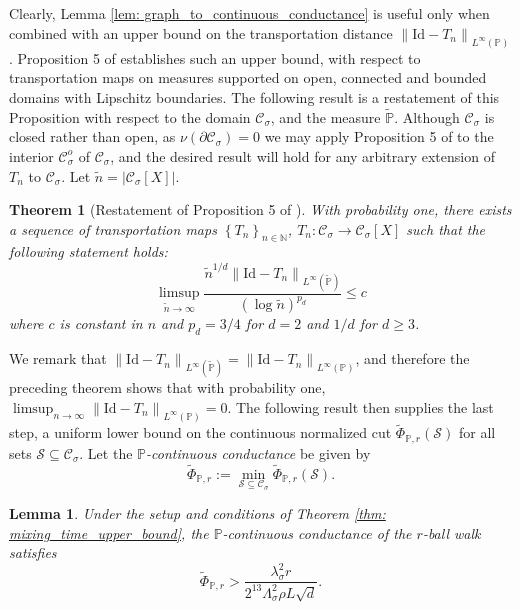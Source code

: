 \documentclass[11pt,twoside]{article}
\newtheorem{theorem}{Theorem}
\newtheorem{lemma}{Lemma}
\newcommand{\seq}[1]{\left\{#1\right\}_{n \in \mathbb{N}}}
\newcommand{\abs}[1]{\left \lvert #1 \right \rvert}
\newcommand{\norm}[1]{\left\lVert#1\right\rVert}
\newcommand{\1}{\mathbf{1}}
\newcommand{\Xbf}{X}             %
\newcommand{\Pbb}{\mathbb{P}}
\newcommand{\Sset}{\mathcal{S}}
\newcommand{\Cset}{\mathcal{C}}
\newcommand{\Csig}{\Cset_{\sigma}}
\begin{document}
Clearly, Lemma \ref{lem: graph_to_continuous_conductance} is useful only when combined with an upper bound on the transportation distance $\norm{\mathrm{Id} - T_n}_{L^{\infty}(\Pbb)}$. Proposition 5 of \cite{garciatrillos16} establishes such an upper bound, with respect to transportation maps on measures supported on open, connected and bounded domains with Lipschitz boundaries. The following result is a restatement of this Proposition with respect to the domain $\Csig$, and the measure $\widetilde{\Pbb}$. Although $\Csig$ is closed rather than open, as $\nu(\partial \Csig) = 0$ we may apply Proposition 5 of \cite{garciatrillos16} to the interior $\Csig^o$ of $\Csig$, and the desired result will hold for any arbitrary extension of $T_n$ to $\Csig$. Let $\widetilde{n} = \abs{\Csig[\Xbf]}$. 

\begin{theorem}[Restatement of Proposition 5 of \cite{garciatrillos16}]
	\label{thm: stagnating_transportation_maps}
	With probability one, there exists a sequence of transportation maps $\seq{T_n}$, $T_n: \Csig \to \Csig[\Xbf]$ such that the following statement holds:
	\begin{equation}
	\label{eqn: stagnating_transportation_maps}
	\limsup_{\widetilde{n} \to \infty} \frac{\widetilde{n}^{1/d} \norm{\mathrm{Id} - T_n}_{L^{\infty}(\widetilde{\Pbb})}}{(\log \widetilde{n})^{p_d}} \leq c
	\end{equation}
	where $c$ is constant in $n$ and $p_d = 3/4$ for $d = 2$ and $1/d$ for $d \geq 3$.
\end{theorem}
We remark that $\norm{\mathrm{Id} - T_n}_{L^{\infty}(\widetilde{\Pbb})} = \norm{\mathrm{Id} - T_n}_{L^{\infty}(\Pbb)}$, and therefore the preceding theorem shows that with probability one, $\limsup_{n \to \infty} \norm{\mathrm{Id} - T_n}_{L^{\infty}(\Pbb)} = 0$. The following result then supplies the last step, a uniform lower bound on the continuous normalized cut $\widetilde{\Phi}_{\Pbb,r}(\Sset)$ for all sets $\Sset \subseteq \Csig$. Let the \emph{$\Pbb$-continuous conductance} be given by
\begin{equation*}
\widetilde{\Phi}_{\Pbb,r} := \min_{\Sset \subseteq \Csig} \widetilde{\Phi}_{\Pbb,r}(\Sset).
\end{equation*} 
\begin{lemma}
	\label{lem: nonuniform_continuous_conductance}
	Under the setup and conditions of Theorem \ref{thm: mixing_time_upper_bound}, the $\Pbb$-continuous conductance of the $r$-ball walk satisfies
	\begin{equation*}
	\widetilde{\Phi}_{\Pbb,r} > \frac{\lambda_{\sigma}^2 r}{2^{13} \Lambda_{\sigma}^2 \rho L \sqrt{d}}.
	\end{equation*}
\end{lemma}
\end{document}
